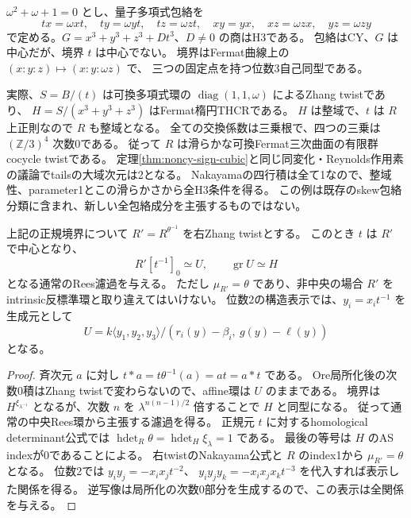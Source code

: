 \begin{example}[位数3の非中央楕円境界は実在する]
\label{ex:normal-elliptic-order3}
$\omega^2+\omega+1=0$ とし、量子多項式包絡を
\[
 tx=\omega xt,\quad ty=\omega yt,\quad tz=\omega zt,\quad
 xy=yx,\quad xz=\omega zx,\quad yz=\omega zy
\]
で定める。$G=x^3+y^3+z^3+Dt^3$、$D\ne0$ の商はH3である。
包絡はCY、$G$ は中心だが、境界 $t$ は中心でない。
境界はFermat曲線上の $(x:y:z)\mapsto(x:y:\omega z)$ で、
三つの固定点を持つ位数3自己同型である。

実際、$S=B/(t)$ は可換多項式環の
$\operatorname{diag}(1,1,\omega)$ によるZhang twistであり、
$H=S/(x^3+y^3+z^3)$ はFermat楕円THCRである。
$H$ は整域で、$t$ は $R$ 上正則なので $R$ も整域となる。
全ての交換係数は三乗根で、四つの三乗は
$(\mathbb Z/3)^4$ 次数0である。
従って $R$ は滑らかな可換Fermat三次曲面の有限群cocycle twistである。
定理\ref{thm:noncy-sign-cubic}と同じ同変化・Reynolds作用素の議論でtailsの大域次元は2となる。
Nakayamaの四行積は全て1なので、整域性、parameter1とこの滑らかさから全H3条件を得る。
この例は既存のskew包絡分類に含まれ、新しい全包絡成分を主張するものではない。
\end{example}

\begin{proposition}
\label{prop:normal-boundary-centralizing-twist}
上記の正規境界について $R'=R^{\theta^{-1}}$ を右Zhang twistとする。
このとき $t$ は $R'$ で中心となり、
\[
 R'[t^{-1}]_0\simeq U,\qquad
 \operatorname{gr}U\simeq H
\]
となる通常のRees濾過を与える。
ただし $\mu_{R'}=\theta$ であり、非中央の場合 $R'$ をintrinsic反標準環と取り違えてはいけない。
位数2の構造表示では、$y_i=x_it^{-1}$ を生成元として
\[
 U=k\langle y_1,y_2,y_3\rangle/
 (r_i(y)-\beta_i,\ g(y)-\ell(y))
\]
となる。
\end{proposition}
\begin{proof}
斉次元 $a$ に対し $t*a=t\theta^{-1}(a)=at=a*t$ である。
Ore局所化後の次数0積はZhang twistで変わらないので、affine環は $U$ のままである。
境界は $H^{\xi_{\lambda^{-1}}}$ となるが、次数 $n$ を
$\lambda^{n(n-1)/2}$ 倍することで $H$ と同型になる。
従って通常の中央Rees環から主張する濾過を得る。
正規元 $t$ に対するhomological determinant公式では
$\operatorname{hdet}_R\theta=\operatorname{hdet}_H\xi_\lambda=1$ である。
最後の等号は $H$ のAS indexが0であることによる。
右twistのNakayama公式と $R$ のindex1から $\mu_{R'}=\theta$ となる。
位数2では $y_iy_j=-x_ix_jt^{-2}$、
$y_iy_jy_k=-x_ix_jx_kt^{-3}$ を代入すれば表示した関係を得る。
逆写像は局所化の次数0部分を生成するので、この表示は全関係を与える。
\end{proof}

